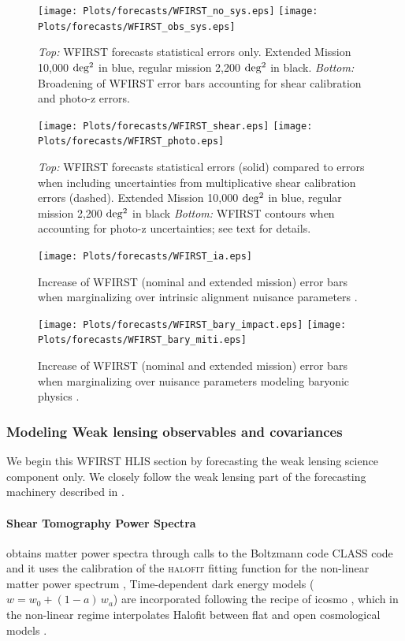 \begin{figure}
\texttt{[image: Plots/forecasts/WFIRST\_no\_sys.eps]}
\texttt{[image: Plots/forecasts/WFIRST\_obs\_sys.eps]}
\caption{\textit{Top:} WFIRST forecasts statistical errors only. Extended Mission 10,000 $\mathrm{deg^2}$ in blue, regular mission 2,200 $\mathrm{deg^2}$ in black. \textit{Bottom:} Broadening of WFIRST error bars accounting for shear calibration and photo-z errors.}
         \label{fi:extended}
\end{figure}

\begin{figure}
\texttt{[image: Plots/forecasts/WFIRST\_shear.eps]}
\texttt{[image: Plots/forecasts/WFIRST\_photo.eps]}
\caption{\textit{Top:} WFIRST forecasts statistical errors (solid) compared to errors when including uncertainties from multiplicative shear calibration errors (dashed).  Extended Mission 10,000 $\mathrm{deg^2}$ in blue, regular mission 2,200 $\mathrm{deg^2}$ in black
\textit{Bottom:} WFIRST contours when accounting for photo-z uncertainties; see text for details.}
         \label{fi:sys_obs}
\end{figure}

\begin{figure}
\texttt{[image: Plots/forecasts/WFIRST\_ia.eps]}
\caption{Increase of WFIRST (nominal and extended mission) error bars when marginalizing over intrinsic alignment nuisance parameters \citep[see][for comparison]{keb16}.}
         \label{fi:IA}
\end{figure}

\begin{figure}
\texttt{[image: Plots/forecasts/WFIRST\_bary\_impact.eps]}
\texttt{[image: Plots/forecasts/WFIRST\_bary\_miti.eps]}
\caption{Increase of WFIRST (nominal and extended mission) error bars when marginalizing over nuisance parameters modeling baryonic physics \citep[see][for details of the method]{ekd15}.}
         \label{fi:bary}
\end{figure}

\subsubsection{Modeling Weak lensing observables and covariances}
\label{sec:lensingbasics}

We begin this WFIRST HLIS section by forecasting the weak lensing science component only. We closely follow the weak lensing part of the forecasting machinery described in \cite{Krause2017}.

\paragraph{Shear Tomography Power Spectra} \CoLi obtains matter power spectra through calls to the Boltzmann code \textsc{CLASS} code \citep{CLASS} and it uses the \citet{tsn12} calibration of the \textsc{halofit} fitting function for the non-linear matter power spectrum \citep{smp03}, Time-dependent dark energy models ($w=w_0+(1-a)\,w_a$) are incorporated following the recipe of {\sc icosmo} \citep{rak11}, which in the non-linear regime interpolates Halofit between flat and open cosmological models \citep[also see][for more details]{shj10}.

